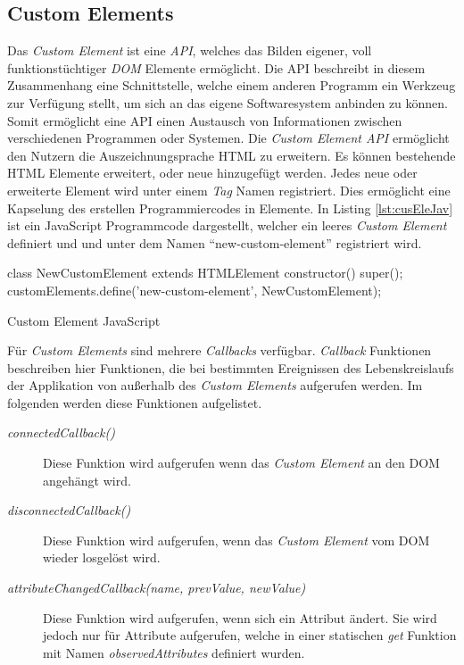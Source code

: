 \documentclass[12pt, paper=a4, bibtotoc, toc=listof, headsepline=true]{scrreprt}
\begin{document}
		\subsection{Custom Elements}
		Das \emph{Custom Element} ist eine \emph{\ac{API}}, welches das Bilden eigener, voll funktionstüchtiger \emph{\ac{DOM}} Elemente ermöglicht.\cite[vgl.]{Denicola2016} Die \ac{API} beschreibt in diesem Zusammenhang eine Schnittstelle, welche einem anderen Programm ein Werkzeug zur Verfügung stellt, um sich an das eigene Softwaresystem anbinden zu können.\cite[vgl.]{Behrendt2016} Somit ermöglicht eine \ac{API} einen Austausch von Informationen zwischen verschiedenen Programmen oder Systemen.	
		Die \emph{Custom Element \ac{API}} ermöglicht den Nutzern die Auszeichnungsprache \ac{HTML} zu erweitern.\cite[vgl.]{Argelius2016} Es können bestehende \ac{HTML} Elemente erweitert, oder neue hinzugefügt werden. Jedes neue oder erweiterte Element wird unter einem \emph{Tag} Namen registriert. Dies ermöglicht eine Kapselung des erstellen Programmiercodes in Elemente. In Listing \ref{lst:cusEleJav} ist ein JavaScript Programmcode dargestellt, welcher ein leeres \emph{Custom Element} definiert und und unter dem Namen \enquote{new-custom-element} registriert wird.
		\begin{listing}
			\begin{JavaScriptcode*}{}
class NewCustomElement extends HTMLElement {
	constructor() {
		super();
	}
}
customElements.define('new-custom-element', NewCustomElement);
			\end{JavaScriptcode*}
			\caption{Custom Element JavaScript}
			\label{lst:cusEleJav}
		\end{listing}
		Für \emph{Custom Elements} sind mehrere \emph{Callbacks} verfügbar. \emph{Callback} Funktionen beschreiben hier Funktionen, die bei bestimmten Ereignissen des Lebenskreislaufs der Applikation von außerhalb des \emph{Custom Elements} aufgerufen werden. Im folgenden werden diese Funktionen aufgelistet.\cite[vgl.]{Argelius2016}
		\begin{description}  
			\item  [\emph{connectedCallback()}] Diese Funktion wird aufgerufen wenn das \emph{Custom Element} an den \ac{DOM} angehängt wird.
			
			\item [\emph{disconnectedCallback()}] Diese Funktion wird aufgerufen, wenn das \emph{Custom Element} vom \ac{DOM} wieder losgelöst wird. 
			
			\item  [\emph{attributeChangedCallback(name, prevValue, newValue)}] Diese Funktion wird aufgerufen, wenn sich ein Attribut ändert. Sie wird jedoch nur für Attribute aufgerufen, welche in einer statischen \emph{get} Funktion mit Namen \emph{observedAttributes} definiert wurden.
		\end{description}
\end{document}
